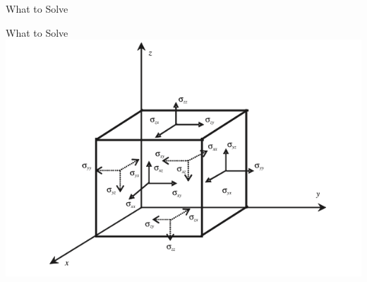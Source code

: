 \documentclass{beamer}
\begin{document}
\begin{section}{What to Solve}
\begin{frame}{What to Solve}
    \quad\includegraphics[scale = 0.4]{Cube.png}


\end{frame}
\end{section}
\end{document}
